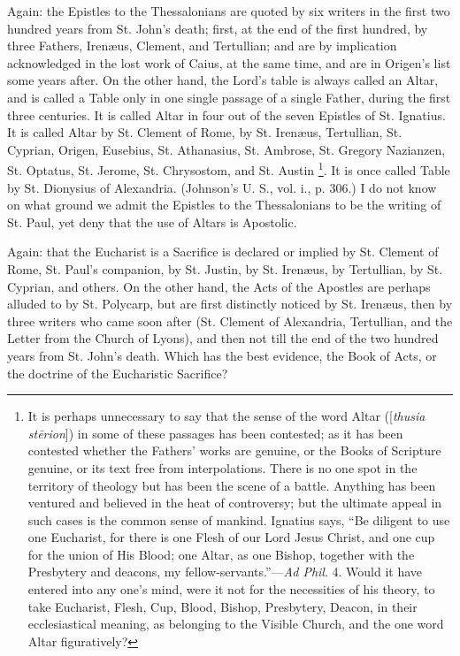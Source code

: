 Again: the Epistles to the Thessalonians are quoted by six writers
in the first two hundred years from St. John's death; first, at the
end of the first hundred, by three Fathers, Irenæus, Clement, and
Tertullian; and are by implication acknowledged in the lost work of
Caius, at the same time, and are in Origen's list some years after. On
the other hand, the Lord's table is always called an Altar, and is
called a Table only in one single passage of a single Father, during
the first three centuries. It is called Altar in four out of the seven
Epistles of St. Ignatius. It is called Altar by St. Clement of Rome,
by St. Irenæus, Tertullian, St. Cyprian, Origen, Eusebius, St.
Athanasius, St. Ambrose, St. Gregory Nazianzen, St. Optatus, St.
Jerome, St. Chrysostom, and St. Austin \footnote{It is perhaps
unnecessary to say that the sense of the word Altar ([\emph{thusia st\={e}rion}])
in some of these passages has been contested; as it has been contested
whether the Fathers' works are genuine, or the Books of Scripture
genuine, or its text free from interpolations. There is no one spot in
the territory of theology but has been the scene of a battle. Anything
has been ventured and believed in the heat of controversy; but the
ultimate appeal in such cases is the common sense of mankind. Ignatius
says, ``Be diligent to use one Eucharist, for there is one Flesh
of our Lord Jesus Christ, and one cup for the union of His Blood; one
Altar, as one Bishop, together with the Presbytery and deacons, my
fellow-servants.''—\emph{Ad Phil}. 4. Would it have entered into
any one's mind, were it not for the necessities of his theory, to take
Eucharist, Flesh, Cup, Blood, Bishop, Presbytery, Deacon, in their
ecclesiastical meaning, as belonging to the Visible Church, and the
one word Altar figuratively?}. It is once called Table by St. Dionysius of Alexandria.
(Johnson's U. S., vol. i., p. 306.) I do not know on what ground we
admit the Epistles to the Thessalonians to be the writing of St. Paul,
yet deny that the use of Altars is Apostolic.

Again: that the Eucharist is a Sacrifice is declared or implied by
St. Clement of Rome, St. Paul's companion, by St. Justin, by St.
Irenæus, by Tertullian, by St. Cyprian, and others. On the other
hand, the Acts of the Apostles are perhaps alluded to by St. Polycarp,
but are first distinctly noticed by St. Irenæus, then by three
writers who came soon after (St. Clement of Alexandria, Tertullian,
and the Letter from the Church of Lyons), and then not till the end of
the two hundred years from St. John's death. Which has the best
evidence, the Book of Acts, or the doctrine of the Eucharistic
Sacrifice?

